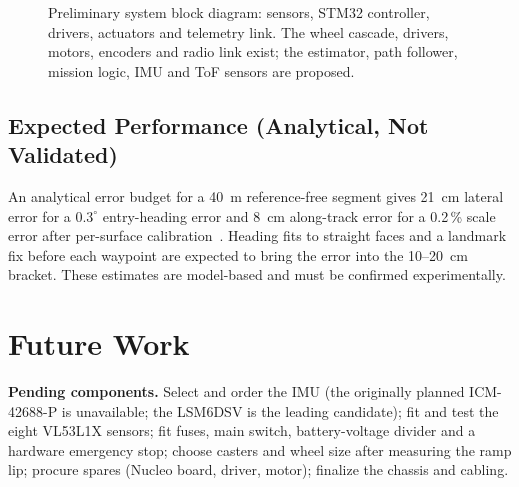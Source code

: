 \documentclass[conference]{IEEEtran}\newcommand{\haveieee}{}%
\begin{document}
\begin{figure}[!t]
{}
\caption{Preliminary system block diagram: sensors, STM32 controller, drivers, actuators and telemetry link. The wheel cascade, drivers, motors, encoders and radio link exist; the estimator, path follower, mission logic, IMU and ToF sensors are proposed.}
\label{fig:blocks}
\end{figure}

\subsection{Expected Performance (Analytical, Not Validated)}
An analytical error budget for a 40~m reference-free segment gives 21~cm lateral error for a $0.3^\circ$ entry-heading error and 8~cm along-track error for a 0.2\,\% scale error after per-surface calibration~\cite{techref}. Heading fits to straight faces and a landmark fix before each waypoint are expected to bring the error into the 10--20~cm bracket. These estimates are model-based and must be confirmed experimentally.

\section{Future Work}
\textbf{Pending components.} Select and order the IMU (the originally planned ICM-42688-P is unavailable; the LSM6DSV is the leading candidate); fit and test the eight VL53L1X sensors; fit fuses, main switch, battery-voltage divider and a hardware emergency stop; choose casters and wheel size after measuring the ramp lip; procure spares (Nucleo board, driver, motor); finalize the chassis and cabling.
\end{document}
